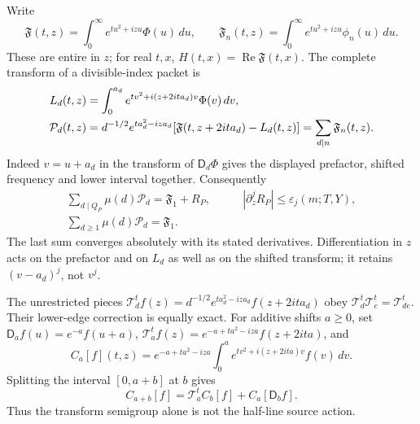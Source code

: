 \documentclass[11pt]{article}
\numberwithin{equation}{section}
\theoremstyle{definition}
\theoremstyle{remark}
\begin{document}
Write
\[
 \mathfrak F(t,z)=\int_0^\infty e^{tu^2+izu}\Phi(u)\,du,
 \qquad \mathfrak F_n(t,z)=\int_0^\infty e^{tu^2+izu}\phi_n(u)\,du.
\]
These are entire in $z$; for real $t,x$, $H(t,x)=\operatorname{Re}
\mathfrak F(t,x)$. The complete transform of a divisible-index packet is
\begin{align}
 L_d(t,z)&=\int_0^{a_d}e^{tv^2+i(z+2ita_d)v}\Phi(v)\,dv,\notag\\
 \mathcal P_d(t,z)
 &=d^{-1/2}e^{ta_d^2-iza_d}
       [\mathfrak F(t,z+2ita_d)-L_d(t,z)]
 =\sum_{d\mid n}\mathfrak F_n(t,z).
 \label{dil:complete-packet}
\end{align}
Indeed $v=u+a_d$ in the transform of $\mathsf D_d\Phi$ gives the
displayed prefactor, shifted frequency and lower interval together.
Consequently
\begin{equation}
 \begin{aligned}
 \sum_{d\mid Q_P}\mu(d)\mathcal P_d=\mathfrak F_1+R_P,
 &\qquad |\partial_z^jR_P|\le\varepsilon_j(m;T,Y),\\
 \sum_{d\ge1}\mu(d)\mathcal P_d=\mathfrak F_1.&
 \end{aligned}
 \label{dil:packet-identities}
\end{equation}
The last sum converges absolutely with its stated derivatives.
Differentiation in $z$ acts on the prefactor and on $L_d$ as well as on
the shifted transform; it retains $(v-a_d)^j$, not $v^j$.

The unrestricted pieces
$\mathcal T_d^tf(z)=d^{-1/2}e^{ta_d^2-iza_d}f(z+2ita_d)$
obey $\mathcal T_d^t\mathcal T_e^t=\mathcal T_{de}^t$.
Their lower-edge correction is equally exact. For additive shifts $a\ge0$,
set $\mathsf D_af(u)=e^{-a}f(u+a)$,
$\mathcal T_a^tf(z)=e^{-a+ta^2-iza}f(z+2ita)$, and
\[
 C_a[f](t,z)=e^{-a+ta^2-iza}
       \int_0^a e^{tv^2+i(z+2ita)v}f(v)\,dv.
\]
Splitting the interval $[0,a+b]$ at $b$ gives
\begin{equation}
 C_{a+b}[f]=\mathcal T_a^t C_b[f]+C_a[\mathsf D_bf].
 \label{dil:lower-cocycle}
\end{equation}
Thus the transform semigroup alone is not the half-line source action.
\end{document}
